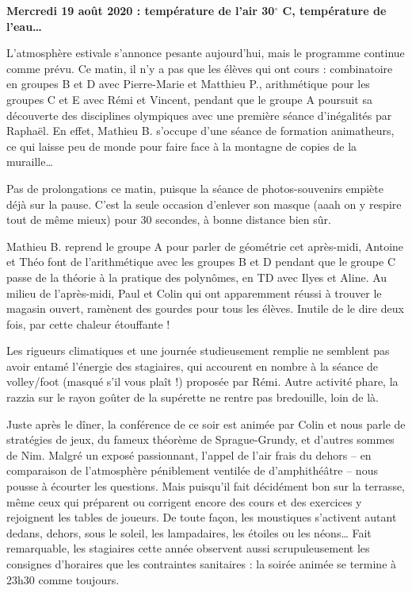 \begin{center}
{\textbf{Mercredi 19 août 2020 : température de l’air 30$^\circ$ C, température de l’eau…}}
\end{center}
\vspace{2mm}


L’atmosphère estivale s’annonce pesante aujourd’hui, mais le programme continue comme prévu. Ce matin, il n’y a pas que les élèves qui ont cours : combinatoire en groupes B et D avec Pierre-Marie et Matthieu P., arithmétique pour les groupes C et E avec Rémi et Vincent, pendant que le groupe A poursuit sa découverte des disciplines olympiques avec une première séance d’inégalités par Raphaël. En effet, Mathieu B. s’occupe d’une séance de formation animatheurs, ce qui laisse peu de monde pour faire face à la montagne de copies de la muraille…


Pas de prolongations ce matin, puisque la séance de photos-souvenirs empiète déjà sur la pause. C’est la seule occasion d’enlever son masque (aaah on y respire tout de même mieux) pour 30 secondes, à bonne distance bien sûr.


Mathieu B. reprend le groupe A pour parler de géométrie cet après-midi, Antoine et Théo font de l’arithmétique avec les groupes B et D pendant que le groupe C passe de la théorie à la pratique des polynômes, en TD avec Ilyes et Aline. Au milieu de l’après-midi, Paul et Colin qui ont apparemment réussi à trouver le magasin ouvert, ramènent des gourdes pour tous les élèves. Inutile de le dire deux fois, par cette chaleur étouffante !


Les rigueurs climatiques et une journée studieusement remplie ne semblent pas avoir entamé l’énergie des stagiaires, qui accourent en nombre à la séance de volley/foot (masqué s’il vous plaît !) proposée par Rémi. Autre activité phare, la razzia sur le rayon goûter de la supérette ne rentre pas bredouille, loin de là.



Juste après le dîner, la conférence de ce soir est animée par Colin et nous parle de stratégies de jeux, du fameux théorème de Sprague-Grundy, et d’autres sommes de Nim. Malgré un exposé passionnant, l’appel de l’air frais du dehors – en comparaison de l’atmosphère péniblement ventilée de d’amphithéâtre – nous pousse à écourter les questions. Mais puisqu’il fait décidément bon sur la terrasse, même ceux qui préparent ou corrigent encore des cours et des exercices y rejoignent les tables de joueurs. De toute façon, les moustiques s’activent autant dedans, dehors, sous le soleil, les lampadaires, les étoiles ou les néons… Fait remarquable, les stagiaires cette année observent aussi scrupuleusement les consignes d’horaires que les contraintes sanitaires : la soirée animée se termine à 23h30 comme toujours.


